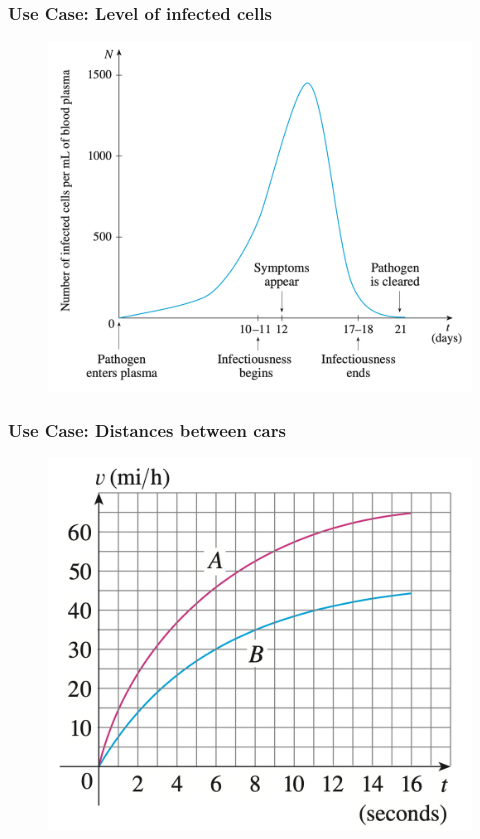 \documentclass[t]{beamer}
\theoremstyle{plain}
\theoremstyle{definition}
\begin{document}
\begin{frame}

\frametitle{Use Case: Level of infected cells}

\begin{figure}[t]
\begin{center}
\includegraphics[scale=0.35]{fig/area_case}
\end{center}
\end{figure}

\end{frame}

\begin{frame}

\frametitle{Use Case: Distances between cars}

\begin{figure}[t]
\begin{center}
\includegraphics[scale=0.35]{fig/area_case2}
\end{center}
\end{figure}

\end{frame}
\end{document}
